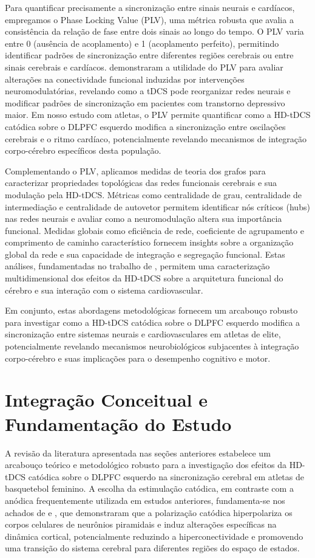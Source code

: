Para quantificar precisamente a sincronização entre sinais neurais e cardíacos, empregamos o Phase Locking Value (PLV), uma métrica robusta que avalia a consistência da relação de fase entre dois sinais ao longo do tempo. O PLV varia entre 0 (ausência de acoplamento) e 1 (acoplamento perfeito), permitindo identificar padrões de sincronização entre diferentes regiões cerebrais ou entre sinais cerebrais e cardíacos.  demonstraram a utilidade do PLV para avaliar alterações na conectividade funcional induzidas por intervenções neuromodulatórias, revelando como a tDCS pode reorganizar redes neurais e modificar padrões de sincronização em pacientes com transtorno depressivo maior. Em nosso estudo com atletas, o PLV permite quantificar como a HD-tDCS catódica sobre o DLPFC esquerdo modifica a sincronização entre oscilações cerebrais e o ritmo cardíaco, potencialmente revelando mecanismos de integração corpo-cérebro específicos desta população.

Complementando o PLV, aplicamos medidas de teoria dos grafos para caracterizar propriedades topológicas das redes funcionais cerebrais e sua modulação pela HD-tDCS. Métricas como centralidade de grau, centralidade de intermediação e centralidade de autovetor permitem identificar nós críticos (hubs) nas redes neurais e avaliar como a neuromodulação altera sua importância funcional. Medidas globais como eficiência de rede, coeficiente de agrupamento e comprimento de caminho característico fornecem insights sobre a organização global da rede e sua capacidade de integração e segregação funcional. Estas análises, fundamentadas no trabalho de , permitem uma caracterização multidimensional dos efeitos da HD-tDCS sobre a arquitetura funcional do cérebro e sua interação com o sistema cardiovascular.

Em conjunto, estas abordagens metodológicas fornecem um arcabouço robusto para investigar como a HD-tDCS catódica sobre o DLPFC esquerdo modifica a sincronização entre sistemas neurais e cardiovasculares em atletas de elite, potencialmente revelando mecanismos neurobiológicos subjacentes à integração corpo-cérebro e suas implicações para o desempenho cognitivo e motor.

\section{Integração Conceitual e Fundamentação do Estudo}
A revisão da literatura apresentada nas seções anteriores estabelece um arcabouço teórico e metodológico robusto para a investigação dos efeitos da HD-tDCS catódica sobre o DLPFC esquerdo na sincronização cerebral em atletas de basquetebol feminino. A escolha da estimulação catódica, em contraste com a anódica frequentemente utilizada em estudos anteriores, fundamenta-se nos achados de  e , que demonstraram que a polarização catódica hiperpolariza os corpos celulares de neurônios piramidais e induz alterações específicas na dinâmica cortical, potencialmente reduzindo a hiperconectividade e promovendo uma transição do sistema cerebral para diferentes regiões do espaço de estados.

